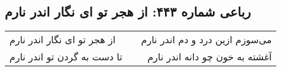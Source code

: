 \begin{center}
\section*{رباعی شماره ۴۴۳: از هجر تو ای نگار اندر نارم}
\label{sec:sh443}
\begin{longtable}{l p{0.5cm} r}
از هجر تو ای نگار اندر نارم
&&
می‌سوزم ازین درد و دم اندر نارم
\\
تا دست به گردن تو اندر نارم
&&
آغشته به خون چو دانه اندر نارم
\\
\end{longtable}
\end{center}
